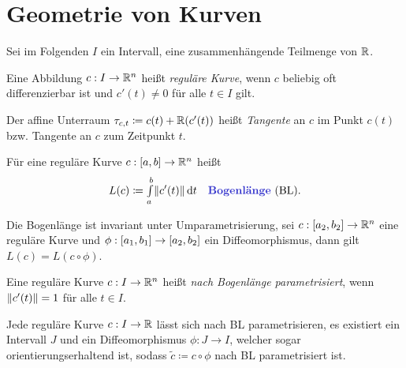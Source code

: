 \documentclass{cheat-sheet}
\newcommand{\Intabdt}[1]{\Int{a}{b}{#1}{t}}
\begin{document}

\section{Geometrie von Kurven}





\begin{nota}
  Sei im Folgenden $I$ ein Intervall, \dh{} eine zusammenhängende Teilmenge von $\mathbb{R}$.
\end{nota}

\begin{defn}
  Eine Abbildung $c : I \to \mathbb{R}^n$ heißt \emph{reguläre Kurve}, wenn $c$ beliebig oft differenzierbar ist und $c'(t) \not= 0$ für alle $t \in I$ gilt.

  Der affine Unterraum $\tau_{c,t} \coloneqq c(t) + \mathbb{R}(c'(t))$ heißt \emph{Tangente} an $c$ im Punkt $c(t)$ bzw. Tangente an $c$ zum Zeitpunkt $t$.
\end{defn}


\begin{defn}
  Für eine reguläre Kurve $c : \left[ a, b \right] \to \mathbb{R}^n$ heißt
  \[ L(c) \coloneqq \Intabdt{\norm{c'(t)}} \quad \text{\emph{Bogenlänge} (BL).} \]
\end{defn}

\begin{satz}
  Die Bogenlänge ist invariant unter Umparametrisierung, \dh{} sei $c : \left[ a_2, b_2 \right] \to \mathbb{R}^n$ eine reguläre Kurve und $\phi : \left[ a_1, b_1 \right] \to \left[ a_2, b_2 \right]$ ein Diffeomorphismus, dann gilt $L(c) = L(c \circ \phi)$.
\end{satz}

\begin{defn}
  Eine reguläre Kurve $c : I \to \mathbb{R}^n$ heißt \emph{nach Bogenlänge parametrisiert}, wenn $\lVert c'(t)\rVert = 1$ für alle $t \in I$.
\end{defn}

\begin{satz}
  Jede reguläre Kurve $c : I \to \mathbb{R}$ lässt sich nach BL parametrisieren, \dh{} es existiert ein Intervall $J$ und ein Diffeomorphismus $\phi : J \to I$, welcher sogar orientierungserhaltend ist, sodass $\tilde{c} \coloneqq c \circ \phi$ nach BL parametrisiert ist.
\end{satz}
\end{document}
